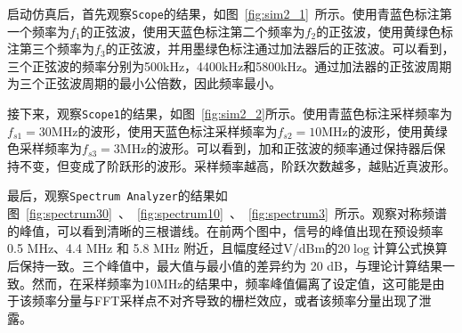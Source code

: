 启动仿真后，首先观察\lstinline{Scope}的结果，如图~\ref{fig:sim2_1}~所示。使用青蓝色标注第一个频率为$f_1$的正弦波，使用天蓝色标注第二个频率为$f_2$的正弦波，使用黄绿色标注第三个频率为$f_3$的正弦波，并用墨绿色标注通过加法器后的正弦波。可以看到，三个正弦波的频率分别为500kHz，4400kHz和5800kHz。通过加法器的正弦波周期为三个正弦波周期的最小公倍数，因此频率最小。

接下来，观察\lstinline{Scope1}的结果，如图~\ref{fig:sim2_2}所示。使用青蓝色标注采样频率为$f_{s1} = 30$MHz的波形，使用天蓝色标注采样频率为$f_{s2} = 10$MHz的波形，使用黄绿色采样频率为$f_{s3} = 3$MHz的波形。可以看到，加和正弦波的频率通过保持器后保持不变，但变成了阶跃形的波形。采样频率越高，阶跃次数越多，越贴近真波形。

最后，观察\lstinline{Spectrum Analyzer}的结果如图~\ref{fig:spectrum30}~、~\ref{fig:spectrum10}~、~\ref{fig:spectrum3}~所示。观察对称频谱的峰值，可以看到清晰的三根谱线。在前两个图中，信号的峰值出现在预设频率 0.5 MHz、4.4 MHz 和 5.8 MHz 附近，且幅度经过V/dBm的$20\log$计算公式换算后保持一致。三个峰值中，最大值与最小值的差异约为 20 dB，与理论计算结果一致。然而，在采样频率为10MHz的结果中，频率峰值偏离了设定值，这可能是由于该频率分量与FFT采样点不对齐导致的栅栏效应，或者该频率分量出现了泄露。  



